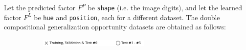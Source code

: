 \begin{definition}
\begin{figure}[H]
\begin{subfigure}[b]{0.45\textwidth}
\begin{subfigure}[b]{0.48\textwidth}
            \end{subfigure}
        \end{subfigure}
    \end{figure}
\end{definition}

\begin{definition}\label{def:2_cgo_experiments}
    Let the predicted factor $F^P$ be \texttt{shape} (i.e. the image digits), and let the 
    learned factor $F^L$ be \texttt{hue} and \texttt{position}, each for a different dataset. The 
    double compositional generalization opportunity datasets are obtained as follows:

    \begin{figure}[H]
        \centering
        \begin{subfigure}[b]{\textwidth}
            \centering
            \includegraphics[width=0.6\textwidth]{img/datasets/_legend.pdf}
        \end{subfigure}
        \vspace{-0.2cm} %


\end{figure}
\end{definition}
